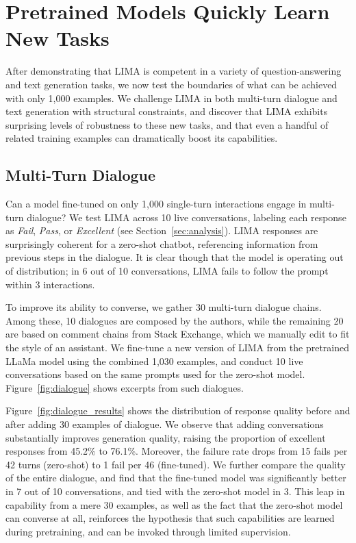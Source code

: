 \section{Pretrained Models Quickly Learn New Tasks}

After demonstrating that LIMA is competent in a variety of question-answering and text generation tasks, we now test the boundaries of what can be achieved with only 1,000 examples.
We challenge LIMA in both multi-turn dialogue and text generation with structural constraints, and discover that LIMA exhibits surprising levels of robustness to these new tasks, and that even a handful of related training examples can dramatically boost its capabilities.


\subsection{Multi-Turn Dialogue}

Can a model fine-tuned on only 1,000 single-turn interactions engage in multi-turn dialogue?
We test LIMA across 10 live conversations, labeling each response as \textit{Fail}, \textit{Pass}, or \textit{Excellent} (see Section~\ref{sec:analysis}).
LIMA responses are surprisingly coherent for a zero-shot chatbot, referencing information from previous steps in the dialogue.
It is clear though that the model is operating out of distribution; in 6 out of 10 conversations, LIMA fails to follow the prompt within 3 interactions.

To improve its ability to converse, we gather 30 multi-turn dialogue chains.
Among these, 10 dialogues are composed by the authors, while the remaining 20 are based on comment chains from Stack Exchange, which we manually edit to fit the style of an assistant.
We fine-tune a new version of LIMA from the pretrained LLaMa model using the combined 1,030 examples, and conduct 10 live conversations based on the same prompts used for the zero-shot model.
Figure~\ref{fig:dialogue} shows excerpts from such dialogues.

Figure~\ref{fig:dialogue_results} shows the distribution of response quality before and after adding 30 examples of dialogue.
We observe that adding conversations substantially improves generation quality, raising the proportion of excellent responses from 45.2\% to 76.1\%.
Moreover, the failure rate drops from 15 fails per 42 turns (zero-shot) to 1 fail per 46 (fine-tuned).
We further compare the quality of the entire dialogue, and find that the fine-tuned model was significantly better in 7 out of 10 conversations, and tied with the zero-shot model in 3.
This leap in capability from a mere 30 examples, as well as the fact that the zero-shot model can converse at all, reinforces the hypothesis that such capabilities are learned during pretraining, and can be invoked through limited supervision.

